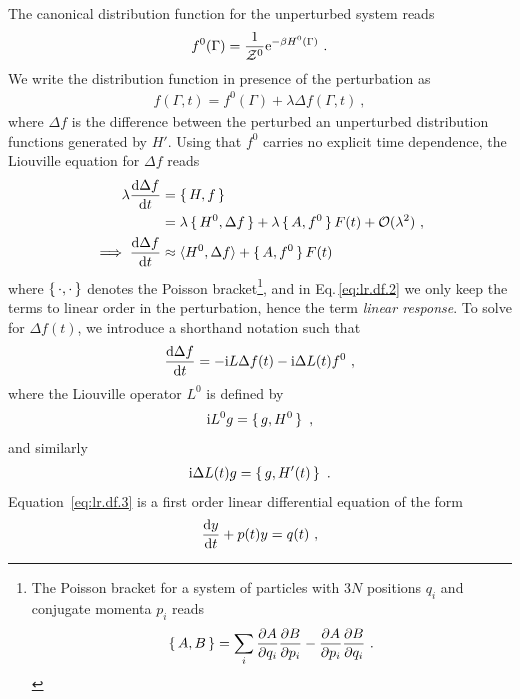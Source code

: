 The canonical distribution function for the unperturbed system reads
\begin{align}
  f^0 (\Gamma) 
    = \frac{1}{\mathcal{Z}^0} {\rm e}^{- \beta H^0 (\Gamma)}~.
  \label{eq:lr.f0}
\end{align}
We write the distribution function in presence of the perturbation as
\begin{align}
  f (\Gamma, t) = f^0(\Gamma) + \lambda \Delta f (\Gamma, t)~,
  \label{eq:lr.f}
\end{align}
where $\Delta f$ is the difference between the perturbed an unperturbed distribution functions generated by $H'$. Using that $f^0$ carries no explicit time dependence, the Liouville equation for $\Delta f$ reads~\cite[p. 68]{Tuckerman}
\begin{align}
  \lambda \frac{{\rm d} \Delta f}{{\rm d} t}
    &= \set{H, f} \nonumber \\
    &= \lambda \set{H^0, \Delta f} 
      + \lambda \set{A, f^0} F(t)
      + \mathcal{O}(\lambda^2)~,
  \label{eq:lr.df.1} \\
  \implies
    \frac{{\rm d} \Delta f}{{\rm d} t}
      &\approx \braket{H^0 , \Delta f} + \set{A, f^0} F(t)
  \label{eq:lr.df.2}
\end{align}
where $\set{\cdot , \cdot}$ denotes the Poisson bracket\footnote{
  The Poisson bracket for a system of particles with $3N$ positions $q_i$ and conjugate momenta $p_i$ reads
  $$
  \set{A, B} = \sum_{i}
  \frac{\partial A}{\partial q_i} \frac{\partial B}{\partial p_i}
  - \frac{\partial A}{\partial p_i} \frac{\partial B}{\partial q_i}~.
  $$
  }, 
and in Eq.\,\eqref{eq:lr.df.2} we only keep the terms to linear order in the perturbation, hence the term \emph{linear response}.
To solve for $\Delta f(t)$, we introduce a shorthand notation such that
\begin{align}
  \frac{{\rm d} \Delta f}{{\rm d} t} = -{\rm i} L \Delta f(t) - {\rm i} \Delta L (t) f^0~,
  \label{eq:lr.df.3}
\end{align}
where the Liouville operator $L^0$ is defined by
\begin{align}
  {\rm i} L^0 g = \set{g, H^0}~,
  \label{eq:lr.L}
\end{align}
and similarly
\begin{align}
  {\rm i} \Delta L (t) g = \set{g, H'(t)}~.
  \label{eq:lr.L'}
\end{align}
Equation~\eqref{eq:lr.df.3} is a first order linear differential equation of the form
\begin{align}
  \frac{{\rm d} y}{{\rm d} t} + p(t) y = q(t)~,
  \label{eq:lr.dgl.1}
\end{align}
